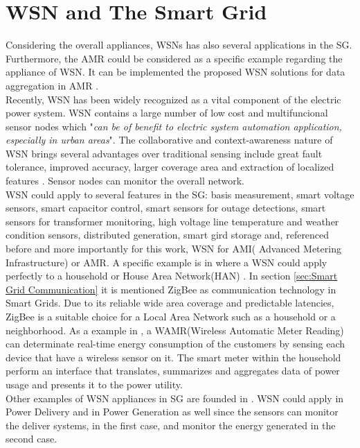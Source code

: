 \section{WSN and  The Smart Grid}
Considering the overall appliances, WSNs has also several applications in the SG. Furthermore, the AMR could be considered as a specific example regarding the appliance of WSN. It can be implemented the proposed WSN solutions for data aggregation in AMR .\\
Recently, WSN has been widely  recognized as a vital component of the electric power system\cite{journals/ijdsn/Liu12}. WSN contains a large number of low cost and multifuncional sensor nodes which "\textit{can be of benefit to electric system automation application, especially in urban areas}"\cite{RePEc:eee:rensus:v:15:y:2011:i:6:p:2736-2742}. The collaborative and context-awareness nature of WSN brings several advantages over traditional sensing include great fault tolerance, improved accuracy, larger coverage area and extraction of localized features \cite{journals/ijdsn/Liu12}. Sensor nodes can monitor the overall network.\\
WSN could apply to several features in the SG: basis measurement, smart voltage sensors, smart capacitor control, smart sensors for outage detections, smart sensors for transformer monitoring, high voltage line temperature and weather condition sensors, distributed generation, smart gird storage and, referenced before and more importantly for this work, WSN for AMI( Advanced Metering Infrastructure) or AMR.
A specific example is in \cite{journals/ijdsn/Liu12} where a WSN could apply perfectly to a household or House Area Network(HAN) . In section \ref{sec:Smart Grid Communication} it is mentioned ZigBee as communication technology in Smart Grids. Due to its reliable wide area coverage and predictable latencies, ZigBee is a suitable choice for a Local Area Network such as a household or a neighborhood. As a example in \cite{journals/ijdsn/Liu12}, a WAMR(Wireless Automatic Meter Reading) can determinate real-time energy consumption of the customers by sensing each device that have a wireless sensor on it. The smart meter within the household perform an interface that translates, summarizes and aggregates data of power usage and presents it to the power utility.\\ 
Other examples of WSN appliances in SG are founded in \cite{journals/ijdsn/Liu12}. WSN could apply in Power Delivery and in Power Generation as well since the sensors can monitor the deliver systems, in the first case, and monitor the energy generated in the second case.\\

